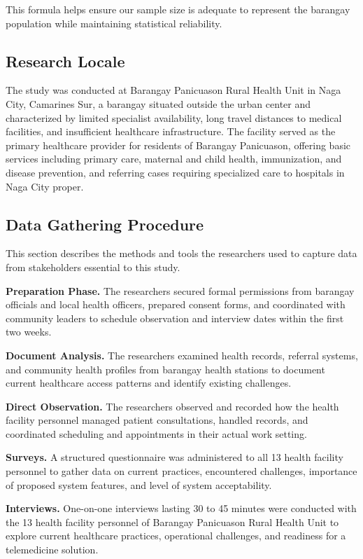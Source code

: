 \documentclass{research}
\begin{document}
This formula helps ensure our sample size is adequate to represent the barangay population while
maintaining statistical reliability.

\subsection*{Research Locale}

The study was conducted at Barangay Panicuason Rural Health Unit in Naga City, Camarines Sur, a
barangay situated outside the urban center and characterized by limited specialist availability,
long travel distances to medical facilities, and insufficient healthcare infrastructure. The
facility served as the primary healthcare provider for residents of Barangay Panicuason, offering
basic services including primary care, maternal and child health, immunization, and disease
prevention, and referring cases requiring specialized care to hospitals in Naga City proper.

\subsection*{Data Gathering Procedure}

This section describes the methods and tools the researchers used to capture data from
stakeholders essential to this study.

\textbf{Preparation Phase.} The researchers secured formal permissions from barangay officials
and local health officers, prepared consent forms, and coordinated with community leaders to
schedule observation and interview dates within the first two weeks.

\textbf{Document Analysis.} The researchers examined health records, referral systems, and
community health profiles from barangay health stations to document current healthcare access
patterns and identify existing challenges.

\textbf{Direct Observation.} The researchers observed and recorded how the health facility
personnel managed patient consultations, handled records, and coordinated scheduling and
appointments in their actual work setting.

\textbf{Surveys.} A structured questionnaire was administered to all 13 health facility personnel
to gather data on current practices, encountered challenges, importance of proposed system
features, and level of system acceptability.

\textbf{Interviews.} One-on-one interviews lasting 30 to 45 minutes were conducted with the 13
health facility personnel of Barangay Panicuason Rural Health Unit to explore current healthcare
practices, operational challenges, and readiness for a telemedicine solution.
\end{document}
